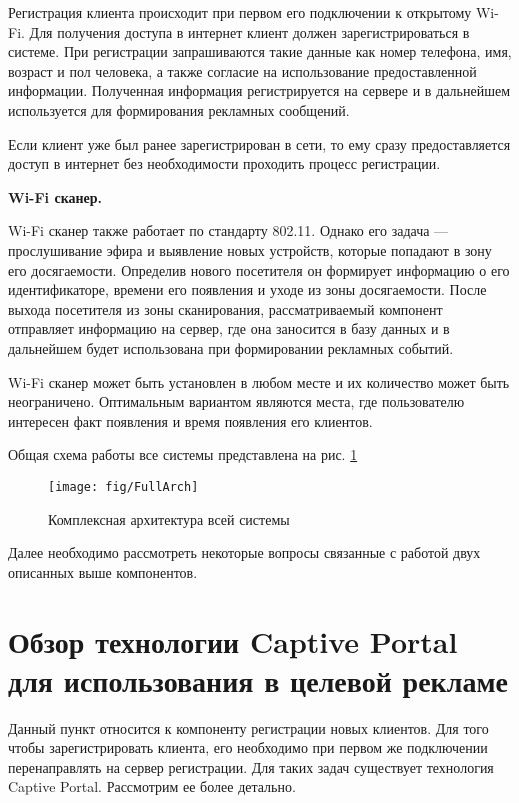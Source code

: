 Регистрация клиента происходит при первом его подключении к открытому Wi-Fi. Для получения доступа в интернет клиент должен зарегистрироваться в системе. При регистрации запрашиваются такие данные как номер телефона, имя, возраст и пол человека, а также согласие на использование предоставленной информации. Полученная информация регистрируется на сервере и в дальнейшем используется для формирования рекламных сообщений.

Если клиент уже был ранее зарегистрирован в сети, то ему сразу предоставляется доступ в интернет без необходимости проходить процесс регистрации.

\textbf{Wi-Fi сканер.}

Wi-Fi сканер также работает по стандарту 802.11. Однако его задача --- прослушивание эфира и выявление новых устройств, которые попадают в зону его досягаемости. Определив нового посетителя он формирует информацию о его идентификаторе, времени его появления и уходе из зоны досягаемости. После выхода посетителя из зоны сканирования, рассматриваемый компонент отправляет информацию на сервер, где она заносится в базу данных и в дальнейшем будет использована при формировании рекламных событий.

Wi-Fi сканер может быть установлен в любом месте и их количество может быть неограничено. Оптимальным вариантом являются места, где пользователю интересен факт появления и время появления его клиентов.

Общая схема работы все системы представлена на рис. \ref{fig:FullArch}

\begin{figure}[h]
	\centering
	\texttt{[image: fig/FullArch]}
	\caption{Комплексная архитектура всей системы}
	\label{fig:FullArch}
\end{figure}


Далее необходимо рассмотреть некоторые вопросы связанные с работой двух описанных выше компонентов.

\section{Обзор технологии Captive Portal для использования в целевой рекламе}

Данный пункт относится к компоненту регистрации новых клиентов. Для того чтобы зарегистрировать клиента, его необходимо при первом же подключении перенаправлять на сервер регистрации. Для таких задач существует технология Captive Portal. Рассмотрим ее более детально.

